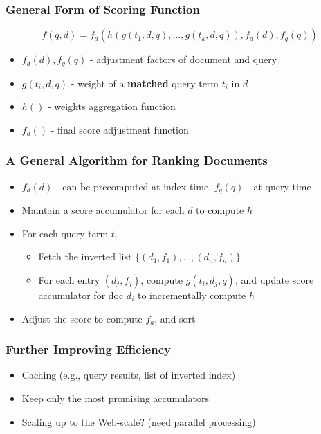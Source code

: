 \subsubsection{General Form of Scoring Function}
\begin{equation*}
f(q,d) = f_a\left( h\left( g(t_1, d, q), \dots, g(t_k, d, q)\right), f_d(d), f_q(q)\right)
\end{equation*}
\begin{itemize}
\item $f_d(d), f_q(q)$ - adjustment factors of document and query
\item $g(t_i, d, q)$ - weight of a \textbf{matched} query term $t_i$ in $d$
\item $h()$ - weights aggregation function 
\item $f_a()$ - final score adjustment function
\end{itemize}


\subsubsection{A General Algorithm for Ranking Documents}
\begin{itemize}
\item $f_d(d)$ - can be precomputed at index time, $f_q(q)$ - at query time
\item Maintain a score accumulator for each $d$ to compute $h$

\item For each query term $t_i$
\begin{itemize}
\item Fetch the inverted list $\{(d_1,f_1),\dots ,(d_n,f_n)\}$
\item For each entry $(d_j,f_j)$, compute $g(t_i,d_j,q)$, and update score accumulator for doc $d_i$ to incrementally compute $h$
\end{itemize}
\item Adjust the score to compute $f_a$, and sort
\end{itemize}


\subsubsection{Further Improving Efficiency}
\begin{itemize}
\item Caching (e.g., query results, list of inverted index)
\item Keep only the most promising accumulators
\item Scaling up to the Web-scale? (need parallel processing)
\end{itemize}


